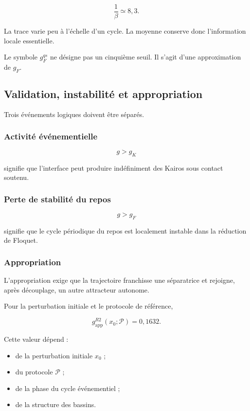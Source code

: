 \[
\frac{1}{\beta}
\simeq8{,}3.
\]

La trace varie peu à l'échelle d'un cycle. La moyenne conserve donc
l'information locale essentielle.

Le symbole \(g_F^{qs}\) ne désigne pas un cinquième seuil. Il s'agit
d'une approximation de \(g_F\).

\subsection{Validation, instabilité et appropriation}
\label{annexe-r2-validation-appropriation}

Trois événements logiques doivent être séparés.

\subsubsection{Activité événementielle}

\[
g>g_K
\]

signifie que l'interface peut produire indéfiniment des Kairos sous
contact soutenu.

\subsubsection{Perte de stabilité du repos}

\[
g>g_F
\]

signifie que le cycle périodique du repos est localement instable dans
la réduction de Floquet.

\subsubsection{Appropriation}

L'appropriation exige que la trajectoire franchisse une séparatrice et
rejoigne, après découplage, un autre attracteur autonome.

Pour la perturbation initiale et le protocole de référence,

\[
\boxed{
g_{\mathrm{app}}^{R2}
(x_0;\mathcal P)
=
0{,}1632.
}
\]

Cette valeur dépend :

\begin{itemize}
\item
  de la perturbation initiale \(x_0\) ;
\item
  du protocole \(\mathcal P\) ;
\item
  de la phase du cycle événementiel ;
\item
  de la structure des bassins.
\end{itemize}

